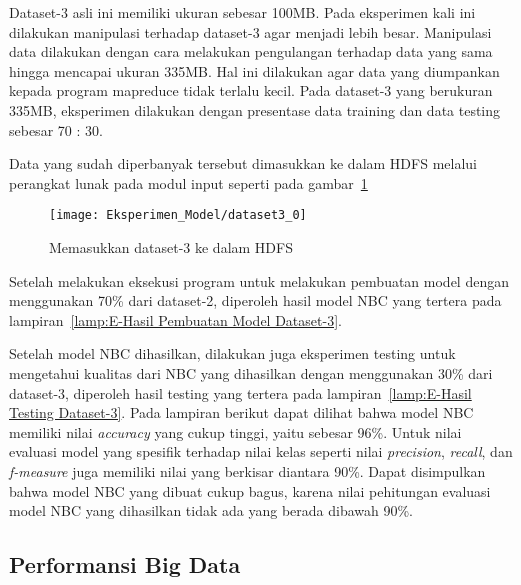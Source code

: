 Dataset-3 asli ini memiliki ukuran sebesar 100MB. Pada eksperimen kali ini dilakukan manipulasi terhadap dataset-3 agar menjadi lebih besar. Manipulasi data dilakukan dengan cara melakukan pengulangan terhadap data yang sama hingga mencapai ukuran 335MB. Hal ini dilakukan agar data yang diumpankan kepada program mapreduce tidak terlalu kecil. Pada dataset-3 yang berukuran 335MB, eksperimen dilakukan dengan presentase data training dan data testing sebesar 70 : 30.

Data yang sudah diperbanyak tersebut dimasukkan ke dalam HDFS melalui perangkat lunak pada modul input seperti pada gambar~\ref{fig:Memasukkan dataset-3 ke dalam HDFS}

\begin{figure}[H]
	\centering
	\texttt{[image: Eksperimen\_Model/dataset3\_0]}
	\caption[Memasukkan dataset-3 ke dalam HDFS]{Memasukkan dataset-3 ke dalam HDFS}
	\label{fig:Memasukkan dataset-3 ke dalam HDFS}
\end{figure}

Setelah melakukan eksekusi program untuk melakukan pembuatan model dengan menggunakan 70\% dari dataset-2, diperoleh hasil model NBC yang tertera pada lampiran~\ref{lamp:E-Hasil Pembuatan Model Dataset-3}.

Setelah model NBC dihasilkan, dilakukan juga eksperimen testing untuk mengetahui kualitas dari NBC yang dihasilkan dengan menggunakan 30\% dari dataset-3, diperoleh hasil testing yang tertera pada lampiran~\ref{lamp:E-Hasil Testing Dataset-3}. Pada lampiran berikut dapat dilihat bahwa model NBC memiliki nilai \textit{accuracy} yang cukup tinggi, yaitu sebesar 96\%. Untuk nilai evaluasi model yang spesifik terhadap nilai kelas seperti nilai \textit{precision}, \textit{recall}, dan \textit{f-measure} juga memiliki nilai yang berkisar diantara 90\%. Dapat disimpulkan bahwa model NBC yang dibuat cukup bagus, karena nilai pehitungan evaluasi model NBC yang dihasilkan tidak ada yang berada dibawah 90\%.

\subsection{Performansi Big Data}
